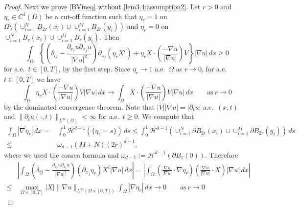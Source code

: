 \documentclass{amsart}
\theoremstyle{definition}
\begin{document}
\begin{proof}
Next we prove \eqref{BVineq} without \eqref{lem3.4:assumption2}.
Let $r>0$ and $\eta_r \in C^1 (\Omega)$ be a cut-off function such that
$\eta_r =1$ on $\Omega \setminus (\cup_{i=1} ^N B_{2r} (x_i) \cup \cup_{i=1} ^M B_{2r} (y_i))$
and $\eta_r=0$ on $\cup_{i=1} ^N B_{r} (x_i) \cup \cup_{i=1} ^M B_{r} (y_i)$.
Then 
\begin{equation}\label{eta-r1}
\int_{\Omega} \left\{
\left( \delta_{ij} - \frac{ \partial_{x_i} u \partial _{x_j} u }{|\nabla u|^2} \right)
\partial_{x_j} (\eta_r X ^i) 
+\eta_r X \cdot \left( \frac{-\nabla u}{|\nabla u|} \right) V
\right\} |\nabla u| \, dx \geq 0
\end{equation}
for a.e.\ $t \in [0,T]$, by the first step. Since $\eta_r \to 1$ a.e.\ $\Omega$ as $r\to 0$, 
for a.e.\ $t \in [0,T]$ we have
\begin{equation}\label{eta-r2}
\int_{\Omega} \eta_r X \cdot \left( \frac{-\nabla u}{|\nabla u|} \right) V |\nabla u| \, dx
\to
\int_{\Omega} X \cdot \left(\frac{-\nabla u}{|\nabla u|} \right) V |\nabla u| \, dx \qquad \text{as} \ r\to 0
\end{equation}
by the dominated convergence theorem. Note that $| V| |\nabla u| =|\partial _t u | $ a.e.\ $(x,t)$ and $\| \partial _t u (\cdot,t) \|_{L^\infty (\Omega)} <\infty$ for a.e.\ $t \geq 0$. 
We compute that
\begin{equation*}
\begin{split}
\int_{\Omega} |\nabla \eta_r | \, dx
= & \, \int_0 ^1 \mathcal{H}^{d-1} (\{ \eta_r =s \}) \, ds
\leq \int_0 ^1 \mathcal{H}^{d-1} (\cup_{i=1} ^N \partial B_{2r} (x_i) \cup \cup_{i=1} ^M \partial B_{2r} (y_i)) \, ds \\
\leq & \, \omega _{d-1} (M+N) (2r)^{d-1},
\end{split}
\end{equation*}
where we used the coarea formula and $\omega_{d-1} := \mathcal{H}^{d-1} (\partial B_1 (0))$.
Therefore
\begin{equation*}
\begin{split}
&\left| \int_{\Omega} \left( \delta_{ij} - \frac{ \partial_{x_i} u \partial _{x_j} u }{|\nabla u|^2} \right)
(\partial_{x_j} \eta_r) X ^i |\nabla u| \, dx \right|
=
\left| \int_{\Omega} \left( \frac{\nabla u}{|\nabla u|} \cdot \nabla \eta_r \right) 
\left( \frac{\nabla u}{|\nabla u|} \cdot X \right)  |\nabla u| \, dx \right| \\
\leq & \, 
\max _{\Omega\times [0,T]} |X| \| \nabla u \|_{L^\infty (\Omega \times [0,T])}
\int_{\Omega} |\nabla \eta_r | \, dx
\to 0 \qquad \text{as} \ r\to 0
\end{split}

\end{equation*}
\end{proof}
\end{document}
